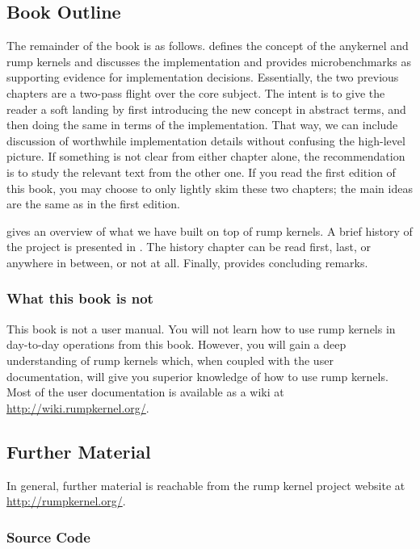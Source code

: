 \subsection{Book Outline}

The remainder of the book is as follows.   defines the
concept of the anykernel and rump kernels and 
discusses the implementation and provides microbenchmarks as supporting
evidence for implementation decisions.  Essentially, the two previous
chapters are a two-pass flight over the core subject.  The intent is to
give the reader a soft landing by first introducing the new concept in
abstract terms, and then doing the same in terms of the implementation.
That way, we can include discussion of worthwhile implementation details
without confusing the high-level picture.  If something is not clear from
either chapter alone, the recommendation is to study the relevant text from
the other one.  If you read the first edition of this book, you may choose
to only lightly skim these two chapters; the main ideas are the same
as in the first edition.

 gives an overview of what we have
built on top of rump kernels.  A brief history of the project is
presented in .  The history chapter can be read first,
last, or anywhere in between, or not at all.  Finally,
 provides concluding remarks.


\subsubsection*{What this book is not}

This book is not a user manual.  You will not learn how to use rump
kernels in day-to-day operations from this book.  However, you will gain a
deep understanding of rump kernels which, when coupled with the user
documentation, will give you superior knowledge of how to use rump
kernels.  Most of the user documentation is available as a wiki at
\url{http://wiki.rumpkernel.org/}.


\subsection{Further Material}

In general, further material is reachable from the rump kernel
project website at \url{http://rumpkernel.org/}.

\subsubsection{Source Code}
\label{sect:src}

